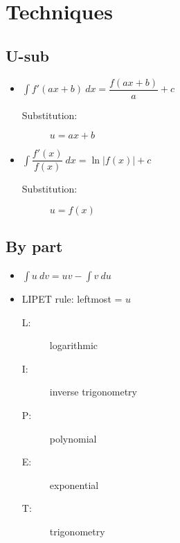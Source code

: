 \section{Techniques}
\subsection{U-sub}
\begin{itemize}
    \item $\int f'(ax+b) \: dx = \dfrac{f(ax+b)}{a}+c$
          \begin{description}
              \item[Substitution:] $u=ax+b$
          \end{description}
    \item $\int \dfrac{f'(x)}{f(x)} \: dx = \ln |f(x)|+c$
          \begin{description}
              \item[Substitution:] $u=f(x)$
          \end{description}
\end{itemize}
\subsection{By part}
\begin{itemize}
    \item $\int u \: dv = uv - \int v \: du$
    \item LIPET rule: leftmost = $u$
          \begin{description}
              \item[L:] logarithmic
              \item[I:] inverse trigonometry
              \item[P:] polynomial
              \item[E:] exponential
              \item[T:] trigonometry
          \end{description}
\end{itemize}